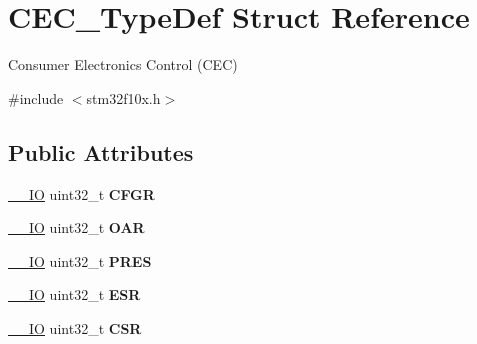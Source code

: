 \hypertarget{struct_c_e_c___type_def}{\section{C\-E\-C\-\_\-\-Type\-Def Struct Reference}
\label{struct_c_e_c___type_def}
}


Consumer Electronics Control (C\-E\-C)  




{\ttfamily \#include $<$stm32f10x.\-h$>$}

\subsection*{Public Attributes}
\begin{DoxyCompactItemize}
\item 
\hypertarget{struct_c_e_c___type_def_a91a55cd277c20e5c5ad228fd9013d014}{\hyperlink{group___c_m_s_i_s__core__definitions_gaec43007d9998a0a0e01faede4133d6be}{\-\_\-\-\_\-\-I\-O} uint32\-\_\-t {\bfseries C\-F\-G\-R}}\label{struct_c_e_c___type_def_a91a55cd277c20e5c5ad228fd9013d014}

\item 
\hypertarget{struct_c_e_c___type_def_aa578935e8a0795a0a7494f4d281bc43d}{\hyperlink{group___c_m_s_i_s__core__definitions_gaec43007d9998a0a0e01faede4133d6be}{\-\_\-\-\_\-\-I\-O} uint32\-\_\-t {\bfseries O\-A\-R}}\label{struct_c_e_c___type_def_aa578935e8a0795a0a7494f4d281bc43d}

\item 
\hypertarget{struct_c_e_c___type_def_a2e1d5865f3d49a195e58f265b425256e}{\hyperlink{group___c_m_s_i_s__core__definitions_gaec43007d9998a0a0e01faede4133d6be}{\-\_\-\-\_\-\-I\-O} uint32\-\_\-t {\bfseries P\-R\-E\-S}}\label{struct_c_e_c___type_def_a2e1d5865f3d49a195e58f265b425256e}

\item 
\hypertarget{struct_c_e_c___type_def_a90adcbf5ee626747170b2f208770628f}{\hyperlink{group___c_m_s_i_s__core__definitions_gaec43007d9998a0a0e01faede4133d6be}{\-\_\-\-\_\-\-I\-O} uint32\-\_\-t {\bfseries E\-S\-R}}\label{struct_c_e_c___type_def_a90adcbf5ee626747170b2f208770628f}

\item 
\hypertarget{struct_c_e_c___type_def_ad9aa13645f701c5457fbf51a9ecf7aa4}{\hyperlink{group___c_m_s_i_s__core__definitions_gaec43007d9998a0a0e01faede4133d6be}{\-\_\-\-\_\-\-I\-O} uint32\-\_\-t {\bfseries C\-S\-R}}\label{struct_c_e_c___type_def_ad9aa13645f701c5457fbf51a9ecf7aa4}


\end{DoxyCompactItemize}
